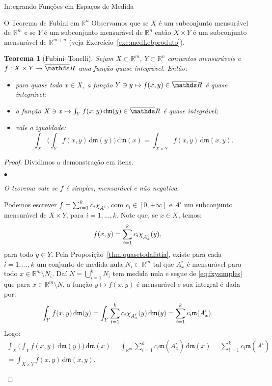 \documentclass[oneside,final,11pt]{amsbook}
\newcommand{\R}{\mathds R}
\newcommand{\leb}{\mathfrak m}
\newcommand{\dd}{\mathrm d}
\newcommand{\chilow}[1]{\chi_{\lower2pt\hbox{$\scriptstyle#1$}}}
\newcounter{contador}
\newenvironment{bulletindent}{\setcounter{contador}{0}
\begin{list} {$\bullet$}
{\usecounter{contador}
\setlength{\leftmargin}{10pt}
\setlength{\rightmargin}{10pt}
\setlength{\labelsep}{5pt}
\setlength{\itemsep}{10pt}
\setlength{\topsep}{10pt}}}
{\end{list}}
\theoremstyle{remark}\newtheorem{exercise}{Exercício}[chapter]
\theoremstyle{remark}\newtheorem{*exercise}[exercise]{\hbox to 0pt{\hskip 0pt minus 1fil*}Exercício}
\theoremstyle{definition}\newtheorem{exdefin}{Definição}[chapter]
\theoremstyle{plain}\newtheorem{teo}{Teorema}[section]
\theoremstyle{plain}\newtheorem{lem}[teo]{Lema}
\theoremstyle{plain}\newtheorem{prop}[teo]{Proposição}
\theoremstyle{plain}\newtheorem{cor}[teo]{Corolário}
\theoremstyle{definition}\newtheorem{defin}[teo]{Definição}
\theoremstyle{remark}\newtheorem{rem}[teo]{Observação}
\theoremstyle{definition}\newtheorem{notation}[teo]{Notação}
\theoremstyle{definition}\newtheorem{convention}[teo]{Convenção}
\theoremstyle{definition}\newtheorem{example}[teo]{Exemplo}
\numberwithin{section}{chapter}
\numberwithin{equation}{section}
\begin{document}
\begin{chapter}{Integrando Funções em Espaços de Medida}
\begin{section}[O Teorema de Fubini em $\R^n$]{O Teorema de Fubini em ${\R^n}$}
Observamos que se $X$ é um subconjunto mensurável de $\R^m$ e se $Y$ é um subconjunto
mensurável de $\R^n$ então $X\times Y$ é um subconjunto mensurável de $\R^{m+n}$
(veja Exercício~\ref{exe:medLebproduto}).
\begin{teo}[Fubini--Tonelli]
\label{thm:Fubini}
Sejam $X\subset\R^m$, $Y\subset\R^n$ conjuntos mensuráveis e $f:X\times Y\to\overline\R$
uma função quase integrável. Então:
\begin{itemize}
\item para quase todo $x\in X$, a função $Y\ni y\mapsto f(x,y)\in\overline\R$ é
quase integrável;
\item a função $X\ni x\mapsto\int_Yf(x,y)\,\dd\leb(y)\in\overline\R$ é
quase integrável;
\item vale a igualdade:
\[\int_X\Big(\int_Yf(x,y)\,\dd\leb(y)\Big)\,\dd\leb(x)=\int_{X\times Y}f(x,y)\,\dd\leb(x,y).\]
\end{itemize}
\end{teo}
\begin{proof}
Dividimos a demonstração em itens.
\begin{bulletindent}
\item {\em O teorema vale se $f$ é simples, mensurável e não negativa}.

Podemos escrever $f=\sum_{i=1}^kc_i\chilow{A^i}$, com $c_i\in[0,+\infty]$ e $A^i$
um subconjunto mensurável de $X\times Y$, para $i=1,\ldots,k$. Note que,
se $x\in X$, temos:
\begin{equation}\label{eq:fxysimples}
f(x,y)=\sum_{i=1}^kc_i\chilow{A^i_x}(y),
\end{equation}
para todo $y\in Y$. Pela Proposição~\ref{thm:quasetodafatia}, existe para cada $i=1,\ldots,k$
um conjunto de medida nula $N_i\subset\R^m$ tal que $A^i_x$ é mensurável para todo
$x\in\R^m\setminus N_i$. Daí $N=\bigcup_{i=1}^kN_i$ tem medida nula e segue de
\eqref{eq:fxysimples} que para $x\in\R^m\setminus N$, a função $y\mapsto f(x,y)$ é mensurável
e sua integral é dada por:
\[\int_Yf(x,y)\,\dd\leb(y)=\int_Y\sum_{i=1}^kc_i\chilow{A^i_x}(y)\,\dd\leb(y)
=\sum_{i=1}^kc_i\leb(A^i_x).\]
Logo:
\begin{multline*}
\int_X\Big(\int_Yf(x,y)\,\dd\leb(y)\Big)\,\dd\leb(x)=\int_{\R^m}\sum_{i=1}^kc_i\leb(A^i_x)\,\dd\leb(x)
=\sum_{i=1}^kc_i\leb(A^i)\\
=\int_{X\times Y}f(x,y)\,\dd\leb(x,y).
\end{multline*}


\end{bulletindent}
\end{proof}
\end{section}
\end{chapter}
\end{document}
